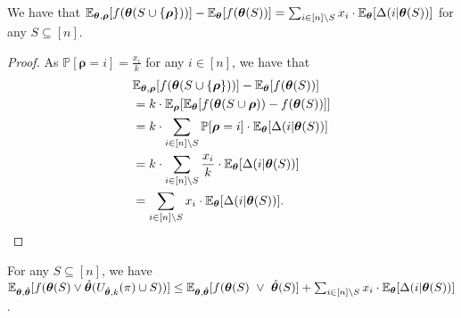 \begin{lemma}\label{lemprel1}
We have that $\mathbb{E}_{\bm \theta,\bm \rho}[f(\bm\theta(S\cup\{\bm \rho\}))]-\mathbb{E}_{\bm \theta}[f(\bm\theta(S))]= \sum_{i\in [n]\setminus S}x_i\cdot \mathbb{E}_{\bm\theta}[\Delta(i|\bm\theta(S))]$ for any $S\subseteq [n]$.
\end{lemma}
\begin{proof}
As $\mathbb{P}[\bm \rho=i]=\frac{x_i}{k}$ for any $i\in [n]$, we have that 
\begin{align*}
&\mathbb{E}_{\bm \theta,\bm \rho}[f(\bm\theta(S\cup\{\bm \rho\}))]-\mathbb{E}_{\bm \theta}[f(\bm\theta(S))]\\
&=k\cdot \mathbb{E}_{\bm \rho}[\mathbb{E}_{\bm\theta}[f(\bm\theta(S\cup{\bm \rho}))-f(\bm\theta(S))]]\\
&=k\cdot \sum_{i\in [n]\setminus S} \mathbb{P}[{\bm \rho}=i]\cdot \mathbb{E}_{\bm\theta}[\Delta(i|\bm\theta(S))]\\
&=k\cdot \sum_{i\in [n]\setminus S} \frac{x_i}{k}\cdot \mathbb{E}_{\bm\theta}[\Delta(i|\bm\theta(S))]\\
&=\sum_{i\in [n]\setminus S} x_i\cdot \mathbb{E}_{\bm\theta}[\Delta(i|\bm\theta(S))].
\end{align*}
\end{proof}


\begin{lemma}\label{lemprel2}
For any $S\subseteq [n]$, we have $\mathbb{E}_{\bm\theta,\hat{\bm \theta}}[f(\bm\theta(S)\vee\hat{\bm \theta}(U_{\hat{\bm\theta},k}(\pi)\cup S))]\\
\leq \mathbb{E}_{\bm\theta,\hat{\bm \theta}}[f( \bm\theta(S)~\vee~\hat{\bm \theta}(S)]+\sum_{i\in [n]\setminus S}x_i\cdot \mathbb{E}_{\bm\theta}[\Delta(i|\bm\theta(S))]$.
\end{lemma}

